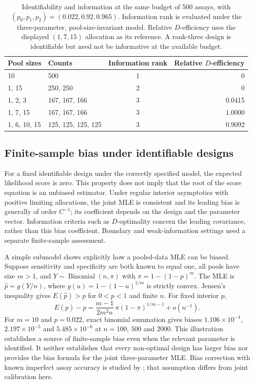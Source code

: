 \documentclass[11pt]{article}
\begin{document}
\begin{table}[!htbp]
\centering\small
\caption{Identifiability and information at the same budget of 500 assays, with $(p_0,p_1,p_2)=(0.022,0.92,0.965)$. Information rank is evaluated under the three-parameter, pool-size-invariant model. Relative $D$-efficiency uses the displayed $(1,7,15)$ allocation as its reference. A rank-three design is identifiable but need not be informative at the available budget.}\label{tab:identification-comparison}
\begin{tabular}{llcr}\toprule
Pool sizes & Counts & Information rank & Relative $D$-efficiency\\\midrule
10 & 500 & 1 & 0\\
1, 15 & 250, 250 & 2 & 0\\
1, 2, 3 & 167, 167, 166 & 3 & 0.0415\\
1, 7, 15 & 167, 167, 166 & 3 & 1.0000\\
1, 6, 10, 15 & 125, 125, 125, 125 & 3 & 0.9092\\
\bottomrule\end{tabular}
\end{table}
\subsection{Finite-sample bias under identifiable designs}\label{app:finite-bias-theory}
For a fixed identifiable design under the correctly specified model, the expected likelihood score is zero. This property does not imply that the root of the score equation is an unbiased estimator. Under regular interior asymptotics with positive limiting allocations, the joint MLE is consistent and its leading bias is generally of order $C^{-1}$; its coefficient depends on the design and the parameter vector. Information criteria such as $D$-optimality concern the leading covariance, rather than this bias coefficient. Boundary and weak-information settings need a separate finite-sample assessment.

A simple submodel shows explicitly how a pooled-data MLE can be biased. Suppose sensitivity and specificity are both known to equal one, all pools have size $m>1$, and $Y\sim\operatorname{Binomial}(n,\pi)$ with $\pi=1-(1-p)^m$. The MLE is $\hat p=g(Y/n)$, where $g(u)=1-(1-u)^{1/m}$ is strictly convex. Jensen's inequality gives $E(\hat p)>p$ for $0<p<1$ and finite $n$. For fixed interior $p$,
\begin{equation}\label{eq:jensen-pooling-bias}
 E(\hat p)-p
 =\frac{m-1}{2m^2 n}\,\pi(1-\pi)^{1/m-1}+o(n^{-1}).
\end{equation}
For $m=10$ and $p=0.022$, exact binomial summation gives biases $1.106\times10^{-4}$, $2.197\times10^{-5}$ and $5.485\times10^{-6}$ at $n=100$, $500$ and $2000$. This illustration establishes a source of finite-sample bias even when the relevant parameter is identified. It neither establishes that every non-optimal design has larger bias nor provides the bias formula for the joint three-parameter MLE. Bias correction with known imperfect assay accuracy is studied by \citet{hepworth:2021:bias}; that assumption differs from joint calibration here.
\end{document}
